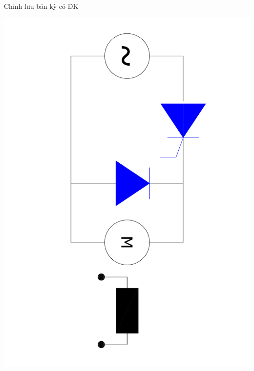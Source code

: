 \documentclass[24pt]{beamer}
\begin{document}
\begin{frame}{Chỉnh lưu bán kỳ có ĐK}
	\begin{center}
		\vspace{-2.5cm}
		\includegraphics[scale=.4, angle=90]{images-chude6/chinh-luu-1pha-co-dieu-khien-them-diode-zero-tai-motor-DC.pdf} 
	\end{center}
\end{frame}
\end{document}
